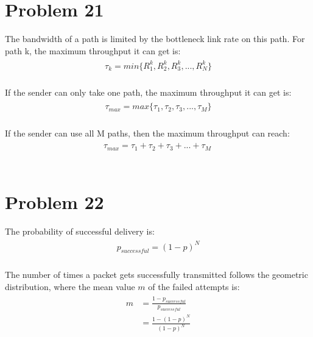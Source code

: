 \documentclass[paper=a4, fontsize=11pt]{scrartcl} %
\numberwithin{equation}{section} %
\numberwithin{figure}{section} %
\numberwithin{table}{section} %
\begin{document}
\section*{Problem 21}
The bandwidth of a path is limited by the bottleneck link rate on this path. For path k, the maximum throughput it can get is:
\begin{align} 
\begin{split}
\tau_k = min\{ R^k_1, R^k_2, R^k_3, ..., R^k_N \}
\end{split}					
\end{align}
\\
If the sender can only take one path, the maximum throughput it can get is:
\begin{align} 
\begin{split}
\tau_{max} = max\{ \tau_1, \tau_2, \tau_3, ..., \tau_M \}
\end{split}					
\end{align}
\\
If the sender can use all M paths, then the maximum throughput can reach:
\begin{align} 
\begin{split}
\tau_{max} = \tau_1 + \tau_2 + \tau_3 + ... + \tau_M \
\end{split}					
\end{align}
\\



\section*{Problem 22}
The probability of successful delivery is:
\begin{align} 
\begin{split}
p_{successful} = (1-p)^N
\end{split}					
\end{align}
\\
The number of times a packet gets successfully transmitted follows the geometric distribution, where the mean value $m$ of the failed attempts is:
\begin{align} 
\begin{split}
m &= \frac{1-p_{successful}}{p_{successful}} \\
&= \frac{1-(1-p)^N}{(1-p)^N}
\end{split}					
\end{align}
\\
\end{document}
